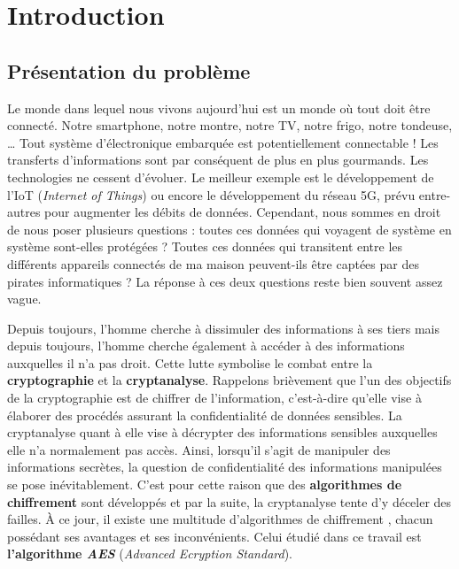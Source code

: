 \documentclass[oneside]{book}
\begin{document}
\newpage
\strut
\thispagestyle{empty}
\newpage
{}



\chapter{Introduction}

\section{Présentation du problème}

Le monde dans lequel nous vivons aujourd’hui est un monde où tout doit être connecté. Notre smartphone, notre montre, notre TV, notre frigo, notre tondeuse, … Tout système d’électronique embarquée est potentiellement connectable ! Les transferts d’informations sont par conséquent de plus en plus gourmands. Les technologies ne cessent d’évoluer. Le meilleur exemple est le développement de l'IoT (\textit{Internet of Things}) ou encore le développement du réseau 5G, prévu entre-autres pour augmenter les débits de données. Cependant, nous sommes en droit de nous poser plusieurs questions : toutes ces données qui voyagent de système en système sont-elles protégées ? Toutes ces données qui transitent entre les différents appareils connectés de ma maison peuvent-ils être captées par des pirates informatiques ? La réponse à ces deux questions reste bien souvent assez vague.

Depuis toujours, l’homme cherche à dissimuler des informations à ses tiers mais depuis toujours, l’homme cherche également à accéder à des informations auxquelles il n’a pas droit. Cette lutte symbolise le combat entre la \textbf{cryptographie} et la \textbf{cryptanalyse}. Rappelons brièvement que l'un des objectifs de la cryptographie \cite{noauthor_cryptographie_2019} est de chiffrer de l’information, c’est-à-dire qu’elle vise à élaborer des procédés assurant la confidentialité de données sensibles. La cryptanalyse \cite{noauthor_cryptanalyse_2019} quant à elle vise à décrypter des informations sensibles auxquelles elle n'a normalement pas accès. Ainsi, lorsqu'il s'agit de manipuler des informations secrètes, la question de confidentialité des informations manipulées se pose inévitablement. C'est pour cette raison que des \textbf{algorithmes de chiffrement} sont développés et par la suite, la cryptanalyse tente d'y déceler des failles. À ce jour, il existe une multitude d'algorithmes de chiffrement \cite{noauthor_liste_2018}, chacun possédant ses avantages et ses inconvénients. Celui étudié dans ce travail est \textbf{l'algorithme \textit{AES}} (\textit{Advanced Ecryption Standard}).
\end{document}
